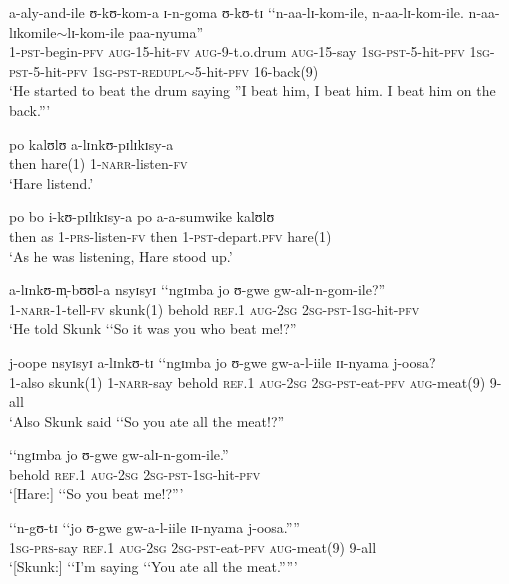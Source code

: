 \begin{exe}
\ex \gll a-aly-and-ile ʊ-kʊ-kom-a ɪ-n-goma ʊ-kʊ-tɪ \lq\lq n-aa-lɪ-kom-ile, n-aa-lɪ-kom-ile. n-aa-lɪkomile$\sim$lɪ-kom-ile paa-nyuma''\\
1-\textsc{pst}-begin-\textsc{pfv} \textsc{aug}-15-hit-\textsc{fv} \textsc{aug}-9-t.o.drum \textsc{aug}-15-say \phantom{\lq\lq}\textsc{1sg}-\textsc{pst}-5-hit-\textsc{pfv} \textsc{1sg}-\textsc{pst}-5-hit-\textsc{pfv} \textsc{1sg}-\textsc{pst}-\textsc{redupl}$\sim$5-hit-\textsc{pfv} 16-back(9)\\
\glt \lq He started to beat the drum saying ''I beat him, I beat him. I beat him on the back.''{}'

\ex \gll po kalʊlʊ a-lɪnkʊ-pɪlɪkɪsy-a\\
then hare(1) 1-\textsc{narr}-listen-\textsc{fv}\\
\glt \lq Hare listend.'

\ex \gll po bo i-kʊ-pɪlɪkɪsy-a po a-a-sumwike kalʊlʊ\\
then as 1-\textsc{prs}-listen-\textsc{fv} then 1-\textsc{pst}-depart.\textsc{pfv} hare(1)\\
\glt \lq As he was listening, Hare stood up.'

\ex \gll a-lɪnkʊ-m̩-bʊʊl-a nsyɪsyɪ \lq\lq ngɪmba jo ʊ-gwe gw-alɪ-n-gom-ile?''\\
1-\textsc{narr}-1-tell-\textsc{fv} skunk(1) \phantom{\lq\lq}behold \textsc{ref.1} \textsc{aug}-\textsc{2sg} \textsc{2sg}-\textsc{pst}-\textsc{1sg}-hit-\textsc{pfv}\\
\glt \lq He told Skunk \lq\lq So it was you who beat me!?''

\ex \gll j-oope nsyɪsyɪ a-lɪnkʊ-tɪ \lq\lq ngɪmba jo ʊ-gwe gw-a-l-iile ɪɪ-nyama j-oosa?\\
1-also skunk(1) 1-\textsc{narr}-say \phantom{\lq\lq}behold \textsc{ref.1} \textsc{aug}-\textsc{2sg} \textsc{2sg}-\textsc{pst}-eat-\textsc{pfv} \textsc{aug}-meat(9) 9-all\\
\glt \lq Also Skunk said \lq\lq So you ate all the meat!?''

\ex \gll \lq\lq ngɪmba jo ʊ-gwe gw-alɪ-n-gom-ile.''\\
\phantom{\lq\lq}behold \textsc{ref.1} \textsc{aug}-\textsc{2sg} \textsc{2sg}-\textsc{pst}-\textsc{1sg}-hit-\textsc{pfv}\\
\glt \lq [Hare:] \lq\lq So you beat me!?''{}'

\ex \gll \lq\lq n-gʊ-tɪ \lq\lq jo ʊ-gwe gw-a-l-iile ɪɪ-nyama j-oosa.''''\\
\phantom{\lq\lq}\textsc{1sg}-\textsc{prs}-say \phantom{\lq\lq}\textsc{ref.1} \textsc{aug}-\textsc{2sg} \textsc{2sg}-\textsc{pst}-eat-\textsc{pfv} \textsc{aug}-meat(9) 9-all\\
\glt \lq [Skunk:] \lq\lq I'm saying \lq\lq You ate all the meat.''{}''{}'


\end{exe}
